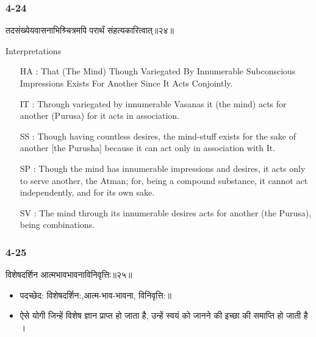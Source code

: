 \begin{frame}[fragile]\frametitle{4-24}
\begin{sanskrit}
तदसंख्येयवासनाभिश्र्चित्रमपि परार्थं संहत्यकारित्वात्॥२४॥
\end{sanskrit}

Interpretations
\begin{itemize}	
\item [HA]: That (The Mind) Though Variegated By Innumerable Subconscious Impressions Exists For Another Since It Acts Conjointly.
\item [IT]: Through variegated by innumerable Vasanas it (the mind) acts for another (Purusa) for it acts in association.
\item [SS]: Though having countless desires, the mind-stuff exists for the sake of another [the Purusha] because it can act only in association with It.
\item [SP]: Though the mind has innumerable impressions and desires, it acts only to serve another, the Atman; for, being a compound substance, it cannot act independently, and for its own sake.
\item [SV]: The mind through its innumerable desires acts for another (the Purusa), being combinations. 
\end{itemize}
\end{frame}

\begin{frame}[fragile]\frametitle{4-25}
\begin{sanskrit}
विशेषदर्शिन आत्मभावभावनाविनिवृत्तिः॥२५॥
\end{sanskrit}

\begin{itemize}
\item पदच्छेद: विशेषदर्शिन:,आत्म-भाव-भावना, विनिवृत्ति:॥
\item  ऐसे योगी जिन्हें विशेष ज्ञान प्राप्त हो जाता है, उन्हें स्वयं को जानने की इच्छा की समाप्ति हो जाती है ।
\end{itemize}
\end{frame}

